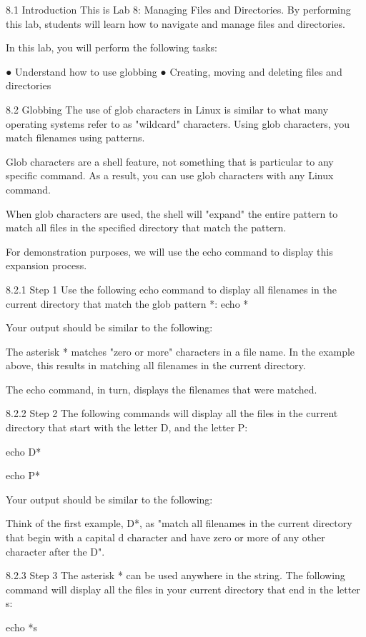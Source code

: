 8.1 Introduction
This is Lab 8: Managing Files and Directories. By performing this lab, students will learn how
to navigate and manage files and directories.

In this lab, you will perform the following tasks:

● Understand how to use globbing
● Creating, moving and deleting files and directories

8.2 Globbing
The use of glob characters in Linux is similar to what many operating systems refer to as
"wildcard" characters. Using glob characters, you match filenames using patterns.

Glob characters are a shell feature, not something that is particular to any specific command. As
a result, you can use glob characters with any Linux command.

When glob characters are used, the shell will "expand" the entire pattern to match all files in the
specified directory that match the pattern.

For demonstration purposes, we will use the echo command to display this expansion process.

8.2.1 Step 1
Use the following echo command to display all filenames in the current directory that match the
glob pattern *:
echo *

Your output should be similar to the following:

The asterisk * matches "zero or more" characters in a file name. In the example above, this
results in matching all filenames in the current directory.

The echo command, in turn, displays the filenames that were matched.

8.2.2 Step 2
The following commands will display all the files in the current directory that start with the letter D,
and the letter P:

echo D*

echo P*

Your output should be similar to the following:



Think of the first example, D*, as "match all filenames in the current directory that begin with a
capital d character and have zero or more of any other character after the D".

8.2.3 Step 3
The asterisk * can be used anywhere in the string. The following command will display all the
files in your current directory that end in the letter s:

echo *s


